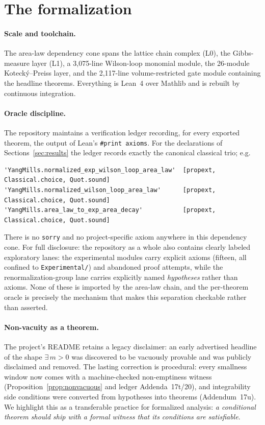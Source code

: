 \documentclass[11pt]{article}
\theoremstyle{remark}
\begin{document}
\section{The formalization}\label{sec:lean}

\paragraph{Scale and toolchain.}
The area-law dependency cone spans the lattice chain complex (L0), the
Gibbs-measure layer (L1), a 3{,}075-line Wilson-loop monomial module, the
26-module Koteck\'y--Preiss layer, and the 2{,}117-line volume-restricted
gate module containing the headline theorems.  Everything is Lean~4 over
Mathlib and is rebuilt by continuous integration.

\paragraph{Oracle discipline.}
The repository maintains a verification ledger recording, for every
exported theorem, the output of Lean's \texttt{\#print axioms}.  For the
declarations of Sections~\ref{sec:results} the ledger records exactly the
canonical classical trio; e.g.
\begin{lstlisting}
'YangMills.normalized_exp_wilson_loop_area_law'  [propext, Classical.choice, Quot.sound]
'YangMills.normalized_wilson_loop_area_law'      [propext, Classical.choice, Quot.sound]
'YangMills.area_law_to_exp_area_decay'           [propext, Classical.choice, Quot.sound]
\end{lstlisting}
There is no \texttt{sorry} and no project-specific axiom anywhere in this
dependency cone.  For full disclosure: the repository as a whole also
contains clearly labeled exploratory lanes: the experimental modules carry
explicit axioms (fifteen, all confined to \texttt{Experimental/}) and
abandoned proof attempts, while the renormalization-group lane carries
explicitly named \emph{hypotheses} rather than axioms.  None of these is
imported by the area-law chain, and the per-theorem oracle is precisely the
mechanism that makes this separation checkable rather than asserted.

\paragraph{Non-vacuity as a theorem.}
The project's README retains a legacy disclaimer: an early advertised
headline of the shape $\exists\, m > 0$ was discovered to be vacuously
provable and was publicly disclaimed and removed.  The lasting correction
is procedural: every smallness window now comes with a machine-checked
non-emptiness witness (Proposition~\ref{prop:nonvacuous} and ledger
Addenda~17t/20), and integrability side conditions were converted from
hypotheses into theorems (Addendum~17u).  We highlight this as a
transferable practice for formalized analysis: \emph{a conditional theorem
should ship with a formal witness that its conditions are satisfiable}.
\end{document}
